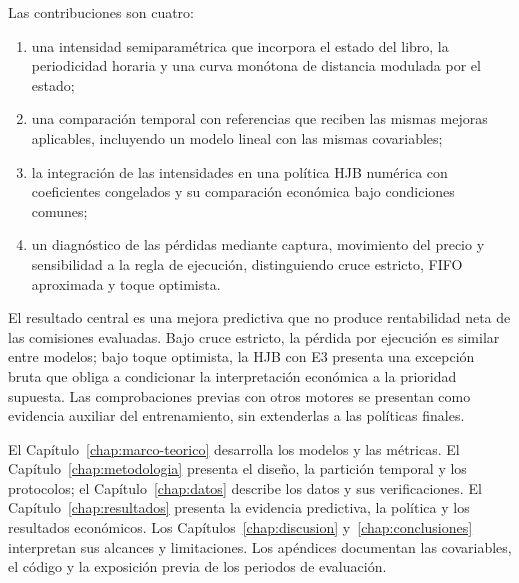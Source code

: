 Las contribuciones son cuatro:
\begin{enumerate}[nosep]
\item una intensidad semiparamétrica que incorpora el estado del libro, la periodicidad horaria y una curva monótona de distancia modulada por el estado;
\item una comparación temporal con referencias que reciben las mismas mejoras aplicables, incluyendo un modelo lineal con las mismas covariables;
\item la integración de las intensidades en una política HJB numérica con coeficientes congelados y su comparación económica bajo condiciones comunes;
\item un diagnóstico de las pérdidas mediante captura, movimiento del precio y sensibilidad a la regla de ejecución, distinguiendo cruce estricto, FIFO aproximada y toque optimista.
\end{enumerate}

El resultado central es una mejora predictiva que no produce rentabilidad neta de las comisiones evaluadas. Bajo cruce estricto, la pérdida por ejecución es similar entre modelos; bajo toque optimista, la HJB con E3 presenta una excepción bruta que obliga a condicionar la interpretación económica a la prioridad supuesta. Las comprobaciones previas con otros motores se presentan como evidencia auxiliar del entrenamiento, sin extenderlas a las políticas finales.

El Capítulo~\ref{chap:marco-teorico} desarrolla los modelos y las métricas. El Capítulo~\ref{chap:metodologia} presenta el diseño, la partición temporal y los protocolos; el Capítulo~\ref{chap:datos} describe los datos y sus verificaciones. El Capítulo~\ref{chap:resultados} presenta la evidencia predictiva, la política y los resultados económicos. Los Capítulos~\ref{chap:discusion} y~\ref{chap:conclusiones} interpretan sus alcances y limitaciones. Los apéndices documentan las covariables, el código y la exposición previa de los periodos de evaluación.
